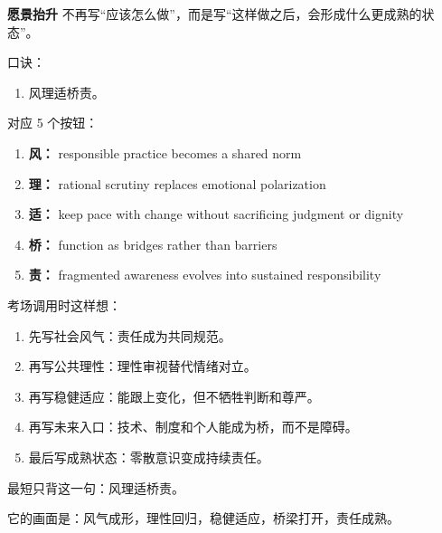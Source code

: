 ﻿\documentclass[lang=cn,11pt]{elegantbook}
\begin{document}
\begin{note}
\textbf{愿景抬升} 不再写“应该怎么做”，而是写“这样做之后，会形成什么更成熟的状态”。

口诀：

\begin{enumerate}
  \item 风理适桥责。
\end{enumerate}

对应 5 个按钮：

\begin{enumerate}
  \item \textbf{风：} responsible practice becomes a shared norm
  \item \textbf{理：} rational scrutiny replaces emotional polarization
  \item \textbf{适：} keep pace with change without sacrificing judgment or dignity
  \item \textbf{桥：} function as bridges rather than barriers
  \item \textbf{责：} fragmented awareness evolves into sustained responsibility
\end{enumerate}

考场调用时这样想：

\begin{enumerate}
  \item 先写社会风气：责任成为共同规范。
  \item 再写公共理性：理性审视替代情绪对立。
  \item 再写稳健适应：能跟上变化，但不牺牲判断和尊严。
  \item 再写未来入口：技术、制度和个人能成为桥，而不是障碍。
  \item 最后写成熟状态：零散意识变成持续责任。
\end{enumerate}

最短只背这一句：风理适桥责。

它的画面是：风气成形，理性回归，稳健适应，桥梁打开，责任成熟。
\end{note}
\end{document}
